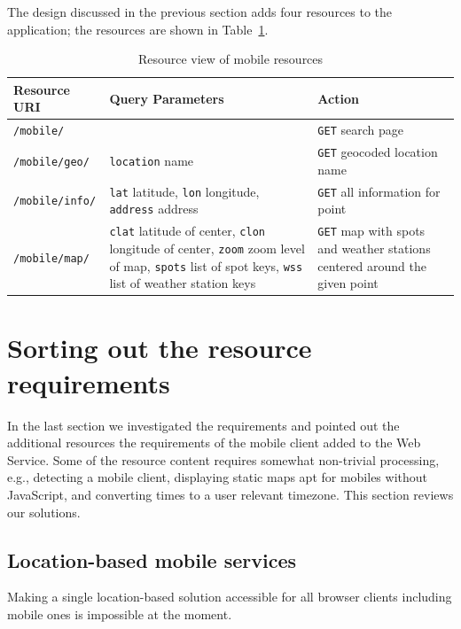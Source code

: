 The design discussed in the previous section adds four resources to the
application; the resources are shown in Table~\ref{tab:mobile_resources}. 

\begin{table}[htbp]
\centering \setlength\extrarowheight{3pt}
\begin{tabularx}{\textwidth}{l X X}
\toprule
Resource URI    & Query Parameters & Action\\\midrule
\verb|/mobile/|          & &\verb|GET| search page\\
\verb|/mobile/geo/|      & \verb|location| name &\verb|GET| geocoded location name\\
\verb|/mobile/info/|     & \verb|lat| latitude, 
                           \verb|lon| longitude, 
                           \verb|address| address & \verb|GET| all information for point\\
\verb|/mobile/map/|      & \verb|clat| latitude of center, 
                           \verb|clon| longitude of center,
                           \verb|zoom| zoom level of map,
                           \verb|spots| list of spot keys,
                           \verb|wss| list of weather station keys & \verb|GET| map with spots and weather stations centered around the given point\\
\bottomrule
\end{tabularx}
\caption{Resource view of mobile resources}\label{tab:mobile_resources}
\end{table}

\section{Sorting out the resource requirements}
In the last section we investigated the requirements and pointed out the
additional resources the requirements of the mobile client added to the Web
Service.  Some of the resource content requires somewhat non-trivial processing,
e.g., detecting a mobile client, displaying static maps apt for mobiles without
JavaScript, and converting times to a user relevant timezone. This section
reviews our solutions.

\subsection{Location-based mobile services}
Making a single location-based solution accessible for all browser clients
including mobile ones is impossible at the moment. 

